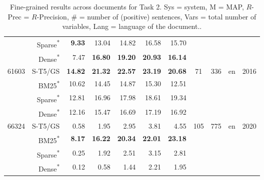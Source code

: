 \documentclass[11pt]{article}
\begin{document}
\begin{table*}[]
\begin{tabular}{l|r|r|r|r|r|r|c|c|c|c}
     &    Sparse\textsuperscript{*} &   \textbf{9.33} &  13.04 &   14.82 &   16.58 &        15.70 &       &     &         &           \\
     &    Dense\textsuperscript{*} &   7.47 &  \textbf{16.80} &   \textbf{19.20} &   \textbf{20.93} &        \textbf{16.14} &       &     &         &           \\
    \hline
    \multirow{4}{3em}{61603} &    S-T5/GS &  \textbf{14.82} &  \textbf{21.32} &   \textbf{22.57} &   \textbf{23.19} &        \textbf{20.68} &       \multirow{4}{2em}{71} &    \multirow{4}{1em}{336} &        \multirow{4}{1em}{en} &            \multirow{4}{2em}{2016} \\
     &    BM25\textsuperscript{*} &  10.62 &  14.45 &   14.87 &   15.30 &        12.51 &        &     &         &           \\
     &    Sparse\textsuperscript{*} &  12.81 &  16.96 &   17.98 &   18.61 &        19.34 &        &     &         &           \\
     &    Dense\textsuperscript{*} &  12.16 &  15.47 &   16.69 &   17.19 &        16.92 &        &     &         &           \\
    \hline
    \multirow{4}{3em}{66324} &    S-T5/GS &   0.58 &   1.95 &    2.95 &    3.81 &         4.55 &      \multirow{4}{2em}{105} &    \multirow{4}{1em}{775} &        \multirow{4}{1em}{en} &            \multirow{4}{2em}{2020} \\
     &    BM25\textsuperscript{*} &   \textbf{8.17} &  \textbf{16.22} &   \textbf{20.34} &   \textbf{22.01} &        \textbf{23.18} &       &     &         &           \\
     &    Sparse\textsuperscript{*} &   0.25 &   1.92 &    2.51 &    3.15 &         2.81 &       &     &         &           \\
     &    Dense\textsuperscript{*} &   0.12 &   0.58 &    1.44 &    2.21 &         1.95 &       &     &         &           \\
    \hline
    \end{tabular}
    \caption{Fine-grained results across documents for Task 2. Sys = system, M = MAP, $R$-Prec = $R$-Precision, \# = number of (positive) sentences, Vars = total number of variables, Lang = language of the document..}
    \label{tab:T2-AvgDoc}
\end{table*}
\end{document}
